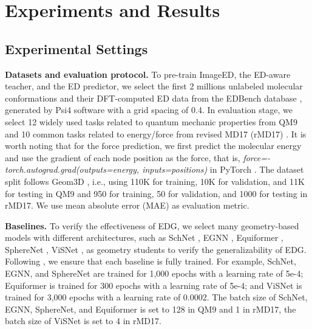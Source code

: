 \documentclass{article}
\begin{document}
\section{Experiments and Results}

\subsection{Experimental Settings}
\textbf{Datasets and evaluation protocol.} To pre-train ImageED, the ED-aware teacher, and the ED predictor, we select the first 2 millions unlabeled molecular conformations and their DFT-computed ED data from the EDBench database \cite{xiang2025edbenchlargescaleelectrondensity}, generated by Psi4 software \cite{turney2012psi4} with a grid spacing of 0.4. In evaluation stage, we select 12 widely used tasks related to quantum mechanic properties from QM9 \cite{ramakrishnan2014quantum} and 10 common tasks related to energy/force from revised MD17 (rMD17) \cite{christensen2020role}. It is worth noting that for the force prediction, we first predict the molecular energy and use the gradient of each node position as the force, that is, \textit{force=-torch.autograd.grad(outputs=energy, inputs=positions)} in PyTorch \cite{paszke2019pytorch}. The dataset split follows Geom3D \cite{liu2024symmetry}, i.e., using 110K for training, 10K for validation, and 11K for testing in QM9 and 950 for training, 50 for validation, and 1000 for testing in rMD17. We use mean absolute error (MAE) as evaluation metric.

\textbf{Baselines.} To verify the effectiveness of EDG, we select many geometry-based models with different architectures, such as SchNet \cite{schutt2017schnet}, EGNN \cite{satorras2021n}, Equiformer \cite{liao2023equiformer}, SphereNet \cite{liu2022spherical}, ViSNet \cite{wang2024enhancing}, as geometry students to verify the generalizability of EDG. Following \cite{liu2022spherical,wang2024enhancing,liu2024symmetry}, we ensure that each baseline is fully trained. For example, SchNet, EGNN, and SphereNet are trained for 1,000 epochs with a learning rate of 5e-4; Equiformer is trained for 300 epochs with a learning rate of 5e-4; and ViSNet is trained for 3,000 epochs with a learning rate of 0.0002. The batch size of SchNet, EGNN, SphereNet, and Equiformer is set to 128 in QM9 and 1 in rMD17, the batch size of ViSNet is set to 4 in rMD17. 
\end{document}
